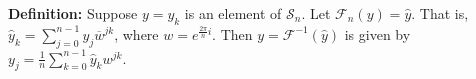 {\bf Definition:} Suppose $y={y_k}$ is an element of $\mathcal{S}_n$. Let $\mathcal{F}_n(y)=\hat{y}$. That is, $\hat{y}_k=\sum_{j=0}^{n-1}y_j\overline{w}^{jk}$, where $w=e^{\frac{2\pi}{n}i}$. Then $y=\mathcal{F}^{-1}(\hat{y})$ is given by $y_j=\frac{1}{n}\sum_{k=0}^{n-1}\hat{y}_kw^{jk}$.